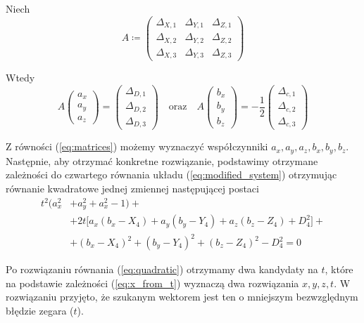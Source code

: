 \documentclass{article}
\begin{document}
Niech
\[
A \coloneqq
\begin{pmatrix}
\Delta_{X,1} & \Delta_{Y,1} & \Delta_{Z, 1} \\
\Delta_{X,2} & \Delta_{Y,2} & \Delta_{Z, 2} \\
\Delta_{X,3} & \Delta_{Y,3} & \Delta_{Z, 3}
\end{pmatrix}
\]

Wtedy
\begin{equation}
    \label{eq:matrices}
    A
    \begin{pmatrix}
        a_x \\ a_y \\ a_z
    \end{pmatrix}
    =
    \begin{pmatrix}
        \Delta_{D, 1} \\ \Delta_{D, 2} \\ \Delta_{D, 3}
    \end{pmatrix}
    \quad \textrm{oraz} \quad
    A
    \begin{pmatrix}
        b_x \\ b_y \\ b_z
    \end{pmatrix}
    =
    -\frac{1}{2}
    \begin{pmatrix}
        \Delta_{c, 1} \\
        \Delta_{c, 2} \\
        \Delta_{c, 3}
    \end{pmatrix}
\end{equation}

Z równości (\ref{eq:matrices}) możemy wyznaczyć współczynniki $a_x, a_y, a_z, b_x, b_y, b_z$.
Następnie, aby otrzymać konkretne rozwiązanie, podstawimy otrzymane zależności do czwartego równania układu
(\ref{eq:modified_system}) otrzymując równanie kwadratowe jednej zmiennej następującej postaci
\begin{equation} \label{eq:quadratic}
\begin{split}
  t^2(a_x^2&+a_y^2+a_x^2-1) + \\
  &+ 2t\big[ a_x(b_x-X_4)+a_y(b_y-Y_4)+a_z(b_z-Z_4)+D_4^2\big] + \\
  &+ (b_x-X_4)^2+(b_y-Y_4)^2+(b_z-Z_4)^2-D_4^2 = 0
\end{split}
\end{equation}

Po rozwiązaniu równania (\ref{eq:quadratic}) otrzymamy dwa kandydaty na $t$, które
na podstawie zależności (\ref{eq:x_from_t}) wyznaczą dwa rozwiązania $x, y, z, t$.
W rozwiązaniu przyjęto, że szukanym wektorem jest ten o mniejszym bezwzględnym błędzie zegara ($t$).
\end{document}
